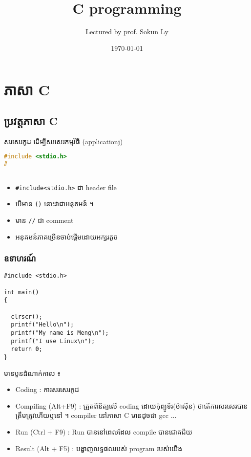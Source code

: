 


\title{C programming}
\author{Lectured by prof. Sokun Ly}
\date{\today}


\maketitle

\chapter{ភាសា C}
\section{ប្រវត្តភាសា C}
សរសេរកូដ ដើម្បីសរសេរកម្មវិធី (applicationj)
\begin{lstlisting}[language=C]
#include <stdio.h>
#



\end{lstlisting}
\begin{itemize}
\item \verb|#include<stdio.h>| ជា header file
\item បើមាន \texttt{()} នោះវាជាអនុគមន៍ ។
\item មាន \texttt{//} ជា comment
\item អនុគមន៍ភាគច្រើនចាប់ផ្តើមដោយអក្សរតូច
\end{itemize}


\subsection{ឧទាហរណ៍}
\begin{lstlisting}[language=cmeng]
#include <stdio.h>

int main()
{

  clrscr();
  printf("Hello\n");
  printf("My name is Meng\n");
  printf("I use Linux\n");
  return 0;
}
\end{lstlisting}
មានបួនដំណាក់កាល ៖
\begin{itemize}
	\item Coding : ការសរសេរកូដ
	\item Compiling (Alt+F9) : ត្រួតពិនិត្យលើ coding ដោយកុំព្យូទ័រ(ម៉ាស៊ីន)
	ថាតើការសរសេរបានត្រឹមត្រូវហើយឬនៅ ។ compiler នៅភាសា C មានដូចជា gcc ...
	\item Run (Ctrl + F9) : Run បាននៅពេលដែល compile បានជោគជ័យ
	\item Result (Alt + F5) : បង្ហាញលទ្ធផលរបស់ program របស់យើង
\end{itemize}



















